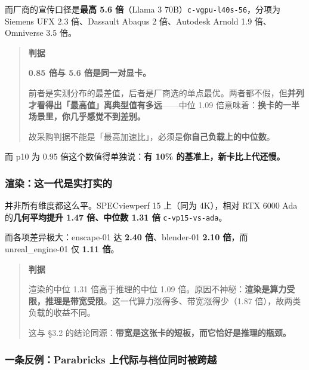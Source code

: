 而厂商的宣传口径是\textbf{最高 5.6 倍}（Llama 3 70B）{\scriptsize\texttt{c-\hspace{0pt}vgpu-\hspace{0pt}l40s-\hspace{0pt}56}}，分项为 Siemens UFX 2.3 倍、Dassault Abaqus 2 倍、Autodesk Arnold 1.9 倍、Omniverse 3.5 倍。


\begin{quote}\small
\textbf{ 判据}

\textbf{0.85 倍与 5.6 倍是同一对显卡。}

前者是实测分布的最差值，后者是厂商选的单点最优。两者都不假，但\textbf{并列才看得出「最高值」离典型值有多远}——中位 1.09 倍意味着：\textbf{换卡的一半场景里，你几乎感觉不到差别。}

故采购判据不能是「最高加速比」，必须是\textbf{你自己负载上的中位数}。

\end{quote}

而 p10 为 0.95 倍这个数值得单独说：\textbf{有 10\% 的基准上，新卡比上代还慢。}


\subsubsection{渲染：这一代是实打实的}

并非所有维度都这么平。SPECviewperf 15 上（同为 4K），相对 RTX 6000 Ada 的\textbf{几何平均提升 1.47 倍、中位数 1.31 倍} {\scriptsize\texttt{c-\hspace{0pt}vp15-\hspace{0pt}vs-\hspace{0pt}ada}}。


而各项差异极大：enscape-01 达 \textbf{2.40 倍}、blender-01 \textbf{2.10 倍}，而 unreal\_engine-01 仅 \textbf{1.11 倍}。


\begin{quote}\small
\textbf{ 判据}

渲染的中位 1.31 倍高于推理的中位 1.09 倍。原因不神秘：\textbf{渲染是算力受限，推理是带宽受限}。这一代算力涨得多、带宽涨得少（1.87 倍），故两类负载的收益不同。

这与 §3.2 的结论同源：\textbf{带宽是这张卡的短板，而它恰好是推理的瓶颈。}

\end{quote}

\subsubsection{一条反例：Parabricks 上代际与档位同时被跨越}

